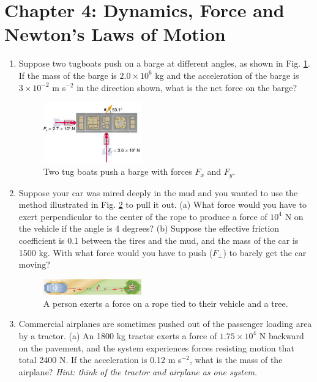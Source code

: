 \documentclass[10pt]{article}
\begin{document}
\clearpage

\section{Chapter 4: Dynamics, Force and Newton's Laws of Motion}

\begin{enumerate}
\item Suppose two tugboats push on a barge at different angles, as shown in Fig. \ref{fig:tug}.  If the mass of the barge is $2.0 \times 10^6$ kg and the acceleration of the barge is $3 \times 10^{-2}$ m s$^{-2}$ in the direction shown, what is the net force on the barge? \\ \vspace{2.5cm}
\begin{figure}
\centering
\includegraphics[width=0.4\textwidth]{tug.png}
\caption{\label{fig:tug} Two tug boats push a barge with forces $F_x$ and $F_y$.}
\end{figure} 
\item Suppose your car was mired deeply in the mud and you wanted to use the method illustrated in Fig. \ref{fig:tree} to pull it out.  (a) What force would you have to exert perpendicular to the center of the rope to produce a force of $10^4$ N on the vehicle if the angle is 4 degrees?  (b)  Suppose the effective friction coefficient is 0.1 between the tires and the mud, and the mass of the car is 1500 kg.  With what force would you have to push ($F_{\perp}$) to barely get the car moving? \\ \vspace{2cm}
\begin{figure}[hb]
\centering
\includegraphics[width=0.4\textwidth]{tree.png}
\caption{\label{fig:tree} A person exerts a force on a rope tied to their vehicle and a tree.}
\end{figure}
\item Commercial airplanes are sometimes pushed out of the passenger loading area by a tractor. (a) An 1800 kg tractor exerts a force of $1.75 \times 10^4$ N backward on the pavement, and the system experiences forces resisting motion that total 2400 N. If the acceleration is 0.12 m s$^{-2}$, what is the mass of the airplane?  \textit{Hint: think of the tractor and airplane as one system.} \\ \vspace{3cm}
\end{enumerate}
\end{document}
